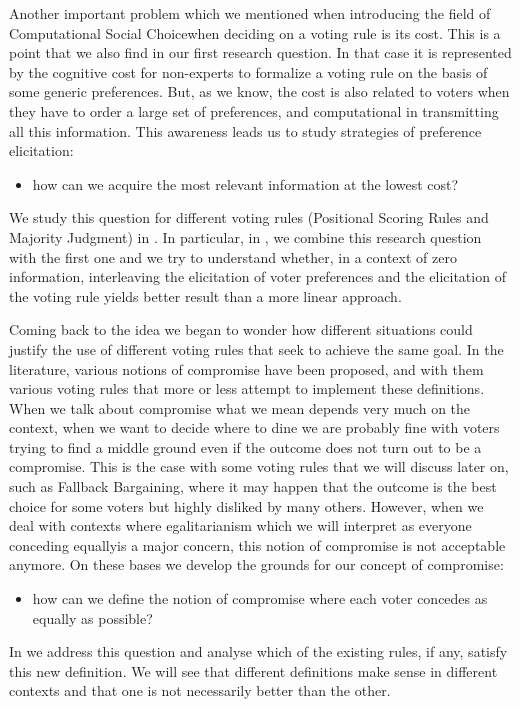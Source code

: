 Another important problem \textemdash which we mentioned when introducing the field of Computational Social Choice\textemdash when deciding on a voting rule is its cost. This is a point that we also find in our first research question. 
In that case it is represented by the cognitive cost for non-experts to formalize a voting rule on the basis of some generic preferences. But, as we know, the cost is also related to voters when they have to order a large set of preferences, and computational in transmitting all this information.
This awareness leads us to study strategies of preference elicitation:
\begin{itemize}
	\item how can we acquire the most relevant information at the lowest cost?
\end{itemize}
We study this question for different voting rules (Positional Scoring Rules and Majority Judgment) in . In particular, in , we combine this research question with the first one and we try to understand whether, in a context of zero information, interleaving the elicitation of voter preferences and the elicitation of the voting rule yields better result than a more linear approach.

Coming back to the idea  we began to wonder how different situations could justify the use of different voting rules that seek to achieve the same goal.
In the literature, various notions of compromise have been proposed, and with them various voting rules that more or less attempt to implement these definitions.
When we talk about compromise what we mean depends very much on the context, when we want to decide where to dine we are probably fine with voters trying to find a middle ground even if the outcome does not turn out to be a compromise. This is the case with some voting rules that we will discuss later on, such as Fallback Bargaining, where it may happen that the outcome is the best choice for some voters but highly disliked by many others.
However, when we deal with contexts where egalitarianism \textemdash which we will interpret as everyone conceding equally\textemdash is a major concern, this notion of compromise is not acceptable anymore.
On these bases we develop the grounds for our concept of compromise:
\begin{itemize}
	\item how can we define the notion of compromise where each voter concedes as equally as possible?
\end{itemize}
In  we address this question and analyse which of the existing rules, if any, satisfy this new definition. We will see that different definitions make sense in different contexts and that one is not necessarily better than the other.

